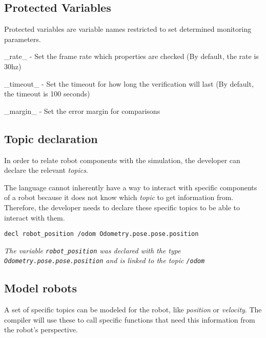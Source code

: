 \subsection{Protected Variables}
\label{ssec:protectedvariables}

Protected variables are variable names restricted to set determined monitoring parameters.

\_rate\_ - Set the frame rate which properties are checked (By default, the rate is 30hz)

\_timeout\_ - Set the timeout for how long the verification will last (By default, the timeout is 100 seconds)

\_margin\_ - Set the error margin for comparisons


\subsection{Topic declaration}
\label{ssec:declarations}

In order to relate robot components with the simulation, the developer can declare the relevant \textit{topics}.

The language cannot inherently have a way to interact with specific components of a robot because it does not know which \textit{topic} to get information from. Therefore, the developer needs to declare these specific topics to be able to interact with them.

\begin{lstlisting}
decl robot_position /odom Odometry.pose.pose.position	
\end{lstlisting}
\textit{The variable \texttt{robot\_position} was declared with the type \texttt{Odometry.pose.pose.position} and is linked to the topic \texttt{/odom}}


\subsection{Model robots}
\label{ssec:models}

A set of specific topics can be modeled for the robot, like \textit{position} or \textit{velocity}. The compiler will use these to call specific functions that need this information from the robot's perspective.

